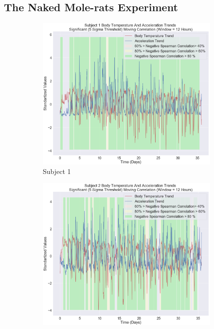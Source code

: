 \documentclass[14pt,a4paper]{scrartcl}
\begin{document}
\subsection{The Naked Mole-rats Experiment}
\label{sec:Results:The Naked Mole-rats Experiment}

\begin{figure}
  \centering
  \begin{subfigure}[b]{0.4\linewidth}
    \includegraphics[width=\linewidth]{exp3_1.png}
     \caption{Subject 1}
  \end{subfigure}
  \begin{subfigure}[b]{0.4\linewidth}
    \includegraphics[width=\linewidth]{exp3_2.png}

\end{subfigure}
\end{figure}
\end{document}

